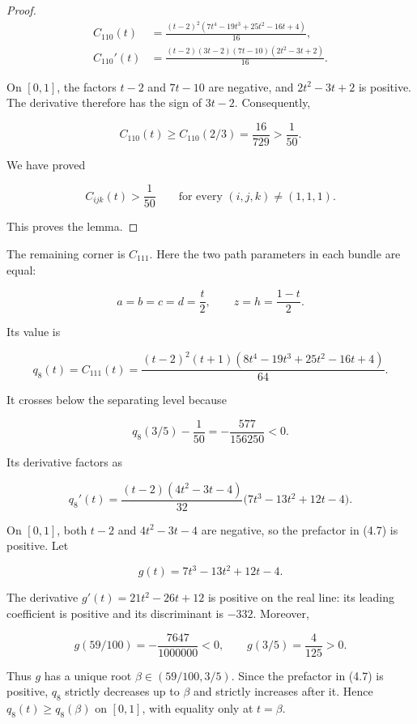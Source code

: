 \documentclass[11pt]{article}
\theoremstyle{definition}
\begin{document}
\begin{proof}
\[
\begin{aligned}
C_{110}(t)
&=\frac{(t-2)^2(7t^4-19t^3+25t^2-16t+4)}{16},\\
C_{110}'(t)
&=\frac{(t-2)(3t-2)(7t-10)(2t^2-3t+2)}{16}.
\end{aligned}                                             \tag{4.4}
\]

On \([0,1]\), the factors \(t-2\) and \(7t-10\) are negative, and
\(2t^2-3t+2\) is positive. The derivative therefore has the sign of
\(3t-2\). Consequently,

\[
C_{110}(t)\ge C_{110}(2/3)=\frac{16}{729}>\frac1{50}.
\]

We have proved

\[
C_{ijk}(t)>\frac1{50}
\qquad\text{for every }(i,j,k)\ne(1,1,1).
\]

This proves the lemma.
\end{proof}

The remaining corner is \(C_{111}\). Here the two path parameters in each
bundle are equal:

\[
a=b=c=d=\frac t2,
\qquad z=h=\frac{1-t}{2}.
\]

Its value is

\[
q_8(t)=C_{111}(t)
=\frac{(t-2)^2(t+1)(8t^4-19t^3+25t^2-16t+4)}{64}.       \tag{4.5}
\]

It crosses below the separating level because

\[
q_8(3/5)-\frac1{50}=-\frac{577}{156250}<0.              \tag{4.6}
\]

Its derivative
factors as

\[
q_8'(t)=\frac{(t-2)(4t^2-3t-4)}{32}
\bigl(7t^3-13t^2+12t-4\bigr).                           \tag{4.7}
\]

On \([0,1]\), both \(t-2\) and \(4t^2-3t-4\) are negative, so the
prefactor in (4.7) is positive. Let

\[
g(t)=7t^3-13t^2+12t-4.
\]

The derivative \(g'(t)=21t^2-26t+12\) is positive on the real line: its
leading coefficient is positive and its discriminant is \(-332\). Moreover,

\[
g(59/100)=-\frac{7647}{1000000}<0,
\qquad g(3/5)=\frac4{125}>0.                             \tag{4.8}
\]

Thus \(g\) has a unique root \(\beta\in(59/100,3/5)\). Since the prefactor
in (4.7) is positive, \(q_8\) strictly decreases up to \(\beta\) and strictly
increases after it. Hence \(q_8(t)\ge q_8(\beta)\) on \([0,1]\), with equality
only at \(t=\beta\).
\end{document}

